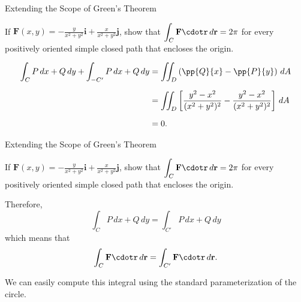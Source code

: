 \documentclass[11pt,english,
handout
]{beamer}
\begin{document}
\begin{frame}[t]{Extending the Scope of Green's Theorem}
\small
\begin{example}
If $\displaystyle \mathbf{F}(x,y)=-\frac{y}{x^2+y^2}\mathbf{i}+\frac{x}{x^2+y^2}\mathbf{j}$, show that $\displaystyle \int_C\mathbf{F}\cdotr\,d\mathbf{r}=2\pi$ for every positively oriented simple closed path that encloses the origin.

\lspace
\begin{align*}
\int_CP\,dx+Q\,dy+\int_{-C'}P\,dx+Q\,dy&=\iint_D\left(\pp{Q}{x}-\pp{P}{y}\right)\,dA\\[2mm]
&=\iint_D\left[\frac{y^2-x^2}{(x^2+y^2)^2}-\frac{y^2-x^2}{(x^2+y^2)^2}\right]\,dA\\[2mm]
&=0.
\end{align*}
\end{example}
\end{frame}












\begin{frame}[t]{Extending the Scope of Green's Theorem}
\small
\begin{example}
If $\displaystyle \mathbf{F}(x,y)=-\frac{y}{x^2+y^2}\mathbf{i}+\frac{x}{x^2+y^2}\mathbf{j}$, show that $\displaystyle \int_C\mathbf{F}\cdotr\,d\mathbf{r}=2\pi$ for every positively oriented simple closed path that encloses the origin.

\lspace
Therefore, 
\[
\int_CP\,dx+Q\,dy=\int_{C'}P\,dx+Q\,dy
\]
which means that 
\[
\int_C\mathbf{F}\cdotr\,d\mathbf{r}=\int_{C'}\mathbf{F}\cdotr\,d\mathbf{r}.
\]\pause

\lspace
We can easily compute this integral using the standard parameterization of the circle.
\end{example}
\end{frame}
\end{document}
